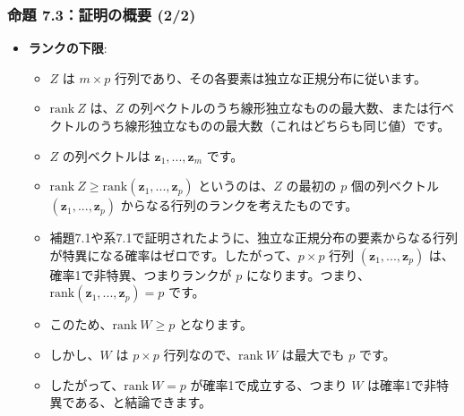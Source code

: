 \documentclass[aspectratio=169]{beamer}
\begin{document}
\begin{frame}
\frametitle{命題 7.3：証明の概要 (2/2)}
\begin{itemize}
    \item \textbf{ランクの下限}:
    \begin{itemize}
        \item $Z$ は $m \times p$ 行列であり、その各要素は独立な正規分布に従います。
        \item $\text{rank}~Z$ は、$Z$ の列ベクトルのうち線形独立なものの最大数、または行ベクトルのうち線形独立なものの最大数（これはどちらも同じ値）です。
        \item $Z$ の列ベクトルは $\bm{z}_1,...,\bm{z}_m$ です。
        \item $\text{rank}~Z\ge\text{rank}(\bm{z}_1,...,\bm{z}_p)$ というのは、$Z$ の最初の $p$ 個の列ベクトル $(\bm{z}_1,...,\bm{z}_p)$ からなる行列のランクを考えたものです。
        \item 補題7.1や系7.1で証明されたように、独立な正規分布の要素からなる行列が特異になる確率はゼロです。したがって、$p \times p$ 行列 $(\bm{z}_1,...,\bm{z}_p)$ は、確率1で非特異、つまりランクが $p$ になります。つまり、$\text{rank}(\bm{z}_1,...,\bm{z}_p)=p$ です。
        \item このため、$\text{rank}~W\ge p$ となります。
        \item しかし、$W$ は $p \times p$ 行列なので、$\text{rank}~W$ は最大でも $p$ です。
        \item したがって、$\text{rank}~W=p$ が確率1で成立する、つまり $W$ は確率1で非特異である、と結論できます。
    \end{itemize}
\end{itemize}
\end{frame}

\end{document}

